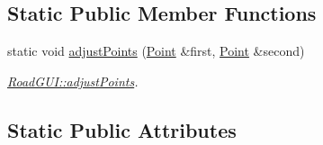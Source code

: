 \subsection*{Static Public Member Functions}
\begin{DoxyCompactItemize}
\item 
static void \hyperlink{classRoadGUI_ab990a1e8cba81b3da4dc4154239dcab4}{adjust\-Points} (\hyperlink{classPoint}{Point} \&first, \hyperlink{classPoint}{Point} \&second)
\begin{DoxyCompactList}\small\item\em \hyperlink{classRoadGUI_ab990a1e8cba81b3da4dc4154239dcab4}{Road\-G\-U\-I\-::adjust\-Points}. \end{DoxyCompactList}\end{DoxyCompactItemize}
\subsection*{Static Public Attributes}
